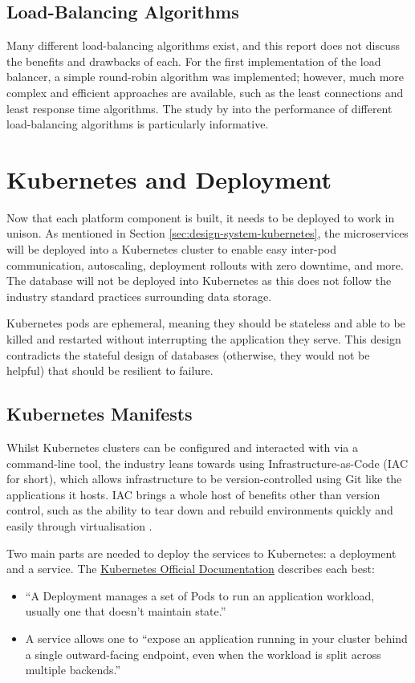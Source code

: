\subsection{Load-Balancing Algorithms}
Many different load-balancing algorithms exist, and this report does not discuss the benefits and drawbacks of each.
For the first implementation of the load balancer, a simple round-robin algorithm was implemented; however, much more complex and efficient approaches are available, such as the least connections and least response time algorithms.
The study by \citeauthor{sharma2008performance} into the performance of different load-balancing algorithms is particularly informative.

\section{Kubernetes and Deployment}
Now that each platform component is built, it needs to be deployed to work in unison. As mentioned in Section \ref{sec:design-system-kubernetes}, the microservices will be deployed into a Kubernetes cluster to enable easy inter-pod communication, autoscaling, deployment rollouts with zero downtime, and more.
The database will not be deployed into Kubernetes as this does not follow the industry standard practices surrounding data storage. 

Kubernetes pods are ephemeral, meaning they should be stateless and able to be killed and restarted without interrupting the application they serve. 
This design contradicts the stateful design of databases (otherwise, they would not be helpful) that should be resilient to failure. 

\subsection{Kubernetes Manifests}
Whilst Kubernetes clusters can be configured and interacted with via a command-line tool, the industry leans towards using Infrastructure-as-Code (IAC for short), which allows infrastructure to be version-controlled using Git like the applications it hosts.
IAC brings a whole host of benefits other than version control, such as the ability to tear down and rebuild environments quickly and easily through virtualisation \citep{huttermann2012infrastructure}.

Two main parts are needed to deploy the services to Kubernetes: a deployment and a service. The \underline{\href{https://kubernetes.io/docs/home/}{Kubernetes Official Documentation}} \nocite{kubernetesdocs} describes each best:
\begin{itemize}
    \item ``A Deployment manages a set of Pods to run an application workload, usually one that doesn't maintain state.''
    \item A service allows one to ``expose an application running in your cluster behind a single outward-facing endpoint, even when the workload is split across multiple backends.''
\end{itemize}

